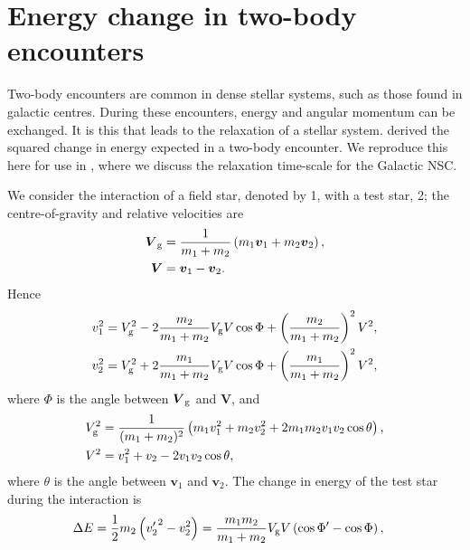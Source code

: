\chapter{Energy change in two-body encounters}\label{ap:Chandra}

Two-body encounters are common in dense stellar systems, such as those found in galactic centres. During these encounters, energy and angular momentum can be exchanged. It is this that leads to the relaxation of a stellar system. \citet[chapter 2]{Chandrasekhar1960} derived the squared change in energy expected in a two-body encounter. We reproduce this here for use in , where we discuss the relaxation time-scale for the Galactic NSC.

We consider the interaction of a field star, denoted by 1, with a test star, 2; the centre-of-gravity and relative velocities are
\begin{subequations}
\label{eq:Vs}
\begin{align}
\boldsymbol{V}_\mathrm{g} = {} & \dfrac{1}{m_1 + m_2}\left(m_1 \boldsymbol{v}_1 + m_2 \boldsymbol{v}_2\right),\\
\boldsymbol{V} = {} & \boldsymbol{v}_1 - \boldsymbol{v}_2.
\end{align}
\end{subequations}
Hence
\begin{subequations}
\begin{align}
v_1^2 = {} & V_\mathrm{g}^2 - 2\dfrac{m_2}{m_1 + m_2}V_\mathrm{g}V \cos\Phi + \left(\dfrac{m_2}{m_1 + m_2}\right)^2V^2,\\
v_2^2 = {} & V_\mathrm{g}^2 + 2\dfrac{m_1}{m_1 + m_2}V_\mathrm{g}V \cos\Phi + \left(\dfrac{m_1}{m_1 + m_2}\right)^2V^2,
\end{align}
\end{subequations}
where $\Phi$ is the angle between $\boldsymbol{V}_\mathrm{g}$ and $\boldsymbol{V}$, and
\begin{subequations}
\label{eq:V2s}
\begin{align}
V_\mathrm{g}^2 = {} & \dfrac{1}{(m_1 + m_2)^2}\left(m_1v_1^2 + m_2v_2^2 + 2 m_1 m_2 v_1 v_2 \cos\theta\right),\\
V^2 = {} & v_1^2 + v_2 - 2 v_1 v_2 \cos\theta,
\end{align}
\end{subequations}
where $\theta$ is the angle between $\boldsymbol{v}_1$ and $\boldsymbol{v}_2$. The change in energy of the test star during the interaction is
\begin{align}
\Delta E = {} & \dfrac{1}{2} m_2 \left({v'_2}^2 - v_2^2\right) = \dfrac{m_1 m_2}{m_1 + m_2}V_\mathrm{g}V\left(\cos\Phi' - \cos\Phi\right),
\end{align}
